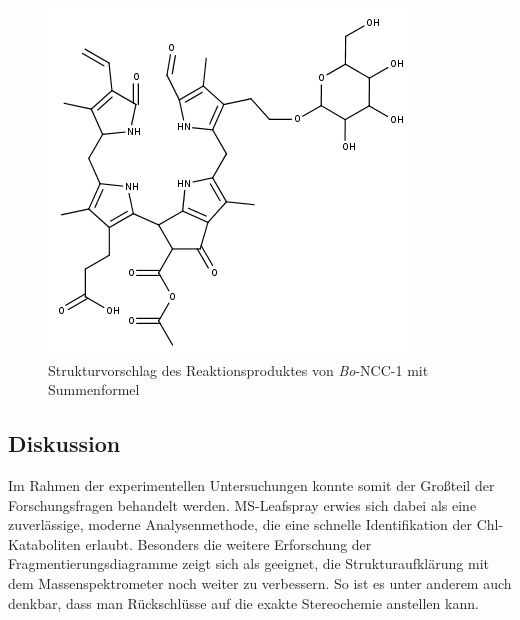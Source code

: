 \documentclass[12pt,a4paper]{article}
\begin{document}
\begin{figure}[htbp]
  \centering
  \includegraphics[scale=0.6]{figures/Kapitel4/Kataboliten/fragmentation_structures/VWA_Katabolit_873.png}
  \caption[Strukturvorschlag des Reaktionsproduktes von \textit{Bo}-NCC-1, Quelle: Autor]{Strukturvorschlag des Reaktionsproduktes von \textit{Bo}-NCC-1 mit Summenformel }
  \label{fig:873MKstructure}
\end{figure}

\pagebreak
\subsection{Diskussion}

Im Rahmen der experimentellen Untersuchungen konnte somit der Großteil der Forschungsfragen behandelt werden. MS-Leafspray erwies sich dabei als eine zuverlässige, moderne Analysenmethode, die eine schnelle Identifikation der Chl-Kataboliten erlaubt. Besonders die weitere Erforschung der Fragmentierungsdiagramme zeigt sich als geeignet, die Strukturaufklärung mit dem Massenspektrometer noch weiter zu verbessern. So ist es unter anderem auch denkbar, dass man Rückschlüsse auf die exakte Stereochemie anstellen kann.

\printbibliography
\listoffigures
\end{document}
